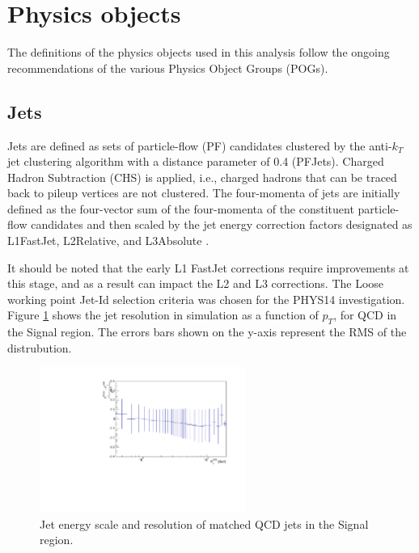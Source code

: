 \section{Physics objects}
\label{sec:objects}
The definitions of the physics objects used in this analysis follow the ongoing recommendations of the various Physics Object Groups (POGs). 

\subsection{Jets}
\label{sec:jetreco}
Jets are defined as sets of particle-flow (PF) candidates clustered by the
anti-$k_{T}$ jet clustering algorithm with a distance parameter of 0.4
(PFJets). Charged Hadron Subtraction (CHS) is applied, i.e., charged
hadrons that can be traced back to pileup vertices are not clustered.
The four-momenta of jets are initially defined as the four-vector sum of
the four-momenta of the constituent particle-flow candidates and then
scaled by the jet energy correction factors designated as L1FastJet,
L2Relative, and L3Absolute \cite{Jet-energy-scale}.

It should be noted that the early L1 FastJet corrections require
improvements at this stage, and as a result can impact the L2 and L3
corrections. The Loose working point Jet-Id selection criteria was
chosen for the PHYS14 investigation. Figure \ref{fig:QCDJets} shows the
jet resolution in simulation as a function of $p_{T}$, for QCD in the Signal region. The errors bars
shown on the y-axis represent the RMS of the distrubution.

\begin{figure}[h]
  \centering
  \includegraphics[width=0.6\textwidth]{figures/PhysicsObjectsPlots/JetResQCDVarBinWidthv3.pdf}
  \caption{Jet energy scale and resolution of matched QCD jets in the Signal region.}
  \label{fig:QCDJets}
\end{figure}
   
